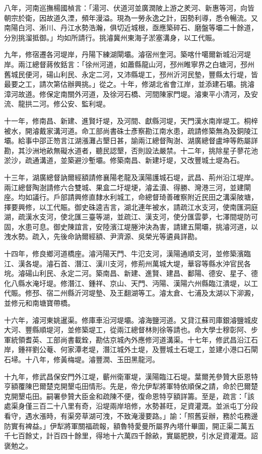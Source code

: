 \begin{pinyinscope}
八年，河南巡撫楊國楨言：「湯河、伏道河並廣潤陂上游之羑河、新惠等河，向皆朝宗於衛，因故道久湮，頻年漫溢。現為一勞永逸之計，因勢利導，悉令暢流。又南陽白河、淅川、丹江水勢浩瀚，俱切近城根，亟應築碎石、磨盤等壩二十餘道，分別挑溜抵御。」均如所請行。挑濬冀州東海子淤塞溝身，以工代賑。

九年，修宿遷各河堤岸，丹陽下練湖閘壩。濬宿州奎河。築喀什噶爾新城沿河堤岸。兩江總督蔣攸銛言：「徐州河道，如蕭縣龍山河，邳州睢寧界之白塘河，邳州舊城民便河，碭山利民、永定二河，又沛縣堤工，邳州沂河民墊，豐縣太行堤，皆最要之工，請次第估辦興挑。」從之。十年，修湖北省會江岸，並添建石壩。挑濬漳河故道。修保定南關外河道，及徐河石橋、河間陳家門堤。濬東平小清河，及安流、龍拱二河。修公安、監利堤。

十一年，修南昌、新建、進賢圩堤，及河間、獻縣河堤，天門漢水南岸堤工。桐梓被水，開濬戴家溝河道。命工部尚書硃士彥察勘江南水患，疏請修築無為及銅陵江壩。給事中邵正笏言江湖漲灘占墾日甚，諭兩江總督陶澍、湖廣總督盧坤等飭屬詳勘，其沙洲地畝無礙水道者，聽民認墾，否則設法嚴禁。十二年，挑除星子蓼花池淤沙，疏通溝道，並築避沙塹壩。修築南昌、新建圩堤，又改豐城土堤為石。

十三年，湖廣總督訥爾經額請修襄陽老龍及漢陽護城石堤，武昌、荊州沿江堤岸。兩江總督陶澍請修六合雙城、果盒二圩堤埂，濬孟瀆、得勝、灣港三河，並建閘座。均如議行。戶部請興修直隸水利城工，命總督琦善確察附近民田之溝渠陂塘，擇要興修，以工代賑。御史硃逵吉言，湖北連年被水，請疏江水支河，使南匯洞庭湖，疏漢水支河，使北匯三臺等湖，並疏江、漢支河，使分匯雲夢，七澤間堤防可固，水患可息。御史陳誼言，安陸濱江堤塍沖決為害，請建五閘壩，挑濬河道，以洩水勢。疏入，先後命訥爾經額、尹濟源、吳榮光等遴員詳勘。

十四年，修良鄉河道橋座。濬沔陽天門、牛氾支河，漢陽通順支河，並修築濱臨江、漢各堤。濬石首、潛江、漢川支河，修荊州萬城大堤，華容等縣水沖官民各垸。濬碭山利民、永定二河。築南昌、新建、進賢、建昌、鄱陽、德安、星子、德化八縣水淹圩堤。修潛江、鍾祥、京山、天門、沔陽、漢陽六州縣臨江潰堤，以工代賑。修邳、宿二州縣沂河堤墊、及王翻湖等工。濬太倉、七浦及太湖以下泖澱，並修元和南塘寶帶橋。

十六年，濬河東姚暹渠。修庫車沿河堤壩。濬海鹽河道。又貸江蘇司庫銀濬鹽城皮大河、豐縣順堤河，並修築堤工，從兩江總督林則徐等請也。命大學士穆彰阿、步軍統領耆英、工部尚書載銓，勘估京城內外應修河道溝渠。十七年，修武昌沿江石岸，鍾祥劉公菴、何家潭老堤，潛江城外土堤，及豐城土石堤工，並建小港口石閘石埽。十八年，修黃梅堤。濬豐潤、玉田黑龍河。

十九年，修武昌保安門外江堤，蘄州衛軍堤，漢陽臨江石堤。葉爾羌參贊大臣恩特亨額覆陳巴爾楚克開墾屯田情形。先是，帝允伊犁將軍特依順保之請，命於巴爾楚克開墾屯田。嗣署參贊大臣金和疏陳不便，復命恩特亨額詳籌。至是，疏言：「該處渠身僅三百二十八里有奇，沿堤兩岸培修，水勢甚旺，足資灌溉。並派屯丁分段看守，遇水漲時，有渠旁草湖可洩，不致淹漫要路。」諭：「照舊妥辦，務於屯務邊防實有裨益。」伊犁將軍關福疏報，額魯特愛曼所屬界內塔什畢圖，開正渠二萬五千七百餘丈，計百四十餘里，得地十六萬四千餘畝，實屬肥腴，引水足資灌溉。詔褒勉之。


\end{pinyinscope}
